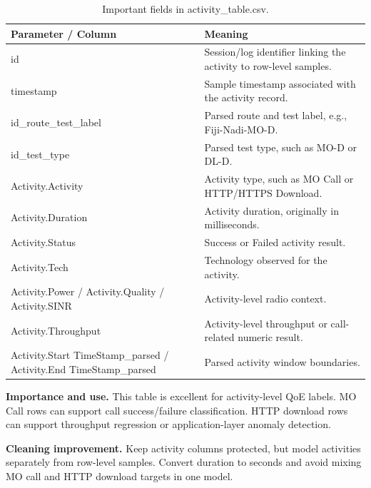 \documentclass[12pt,a4paper]{article}
\begin{document}
\begin{table}[H]
\centering
\begin{tabularx}{\textwidth}{P{0.38\textwidth}Y}
\toprule
\textbf{Parameter / Column} & \textbf{Meaning} \\
\midrule
{\ttfamily id} & Session/log identifier linking the activity to row-level samples. \\
{\ttfamily timestamp} & Sample timestamp associated with the activity record. \\
{\ttfamily id\_\allowbreak{}route\_\allowbreak{}test\_\allowbreak{}label} & Parsed route and test label, e.g., Fiji-Nadi-MO-D. \\
{\ttfamily id\_\allowbreak{}test\_\allowbreak{}type} & Parsed test type, such as MO-D or DL-D. \\
{\ttfamily Activity.\allowbreak{}Activity} & Activity type, such as MO Call or HTTP/HTTPS Download. \\
{\ttfamily Activity.\allowbreak{}Duration} & Activity duration, originally in milliseconds. \\
{\ttfamily Activity.\allowbreak{}Status} & Success or Failed activity result. \\
{\ttfamily Activity.\allowbreak{}Tech} & Technology observed for the activity. \\
{\ttfamily Activity.\allowbreak{}Power /\allowbreak{} Activity.\allowbreak{}Quality /\allowbreak{} Activity.\allowbreak{}SINR} & Activity-level radio context. \\
{\ttfamily Activity.\allowbreak{}Throughput} & Activity-level throughput or call-related numeric result. \\
{\ttfamily Activity.\allowbreak{}Start TimeStamp\_\allowbreak{}parsed /\allowbreak{} Activity.\allowbreak{}End TimeStamp\_\allowbreak{}parsed} & Parsed activity window boundaries. \\
\bottomrule
\end{tabularx}
\caption{Important fields in activity\_table.csv.}
\end{table}


\textbf{Importance and use.} This table is excellent for activity-level QoE labels. MO Call rows can support call success/failure classification. HTTP download rows can support throughput regression or application-layer anomaly detection.

\textbf{Cleaning improvement.} Keep activity columns protected, but model activities separately from row-level samples. Convert duration to seconds and avoid mixing MO call and HTTP download targets in one model.
\end{document}
